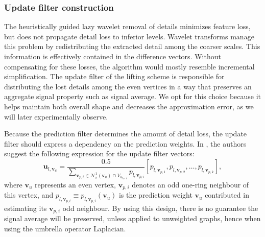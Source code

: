 \documentclass[graybox]{svmult}
\begin{document}
	
	\subsubsection{Update filter construction}
	The heuristically guided lazy wavelet removal of details minimizes feature loss, but does not propagate detail loss to inferior levels. Wavelet transforms manage this problem by redistributing the extracted detail among the coarser scales.  This information is effectively contained in the difference vectors. Without compensating for these losses, the algorithm would mostly resemble incremental simplification. The update filter of the lifting scheme is responsible for distributing the lost details among the even vertices in a way that preserves an aggregate signal property such as signal average. We opt for this choice because it helps maintain both overall shape and decreases the approximation error, as we will later experimentally observe. 
	
	Because the prediction filter determines the amount of detail loss, the update filter should express a dependency on the prediction weights. In \cite{Martinez2011}, the authors suggest the following expression for the update filter vectors:
	\begin{equation}
	\mathbf{u}_{l, \mathbf{v}_{u}} = \frac{0.5}{ \sum\limits_{\mathbf{v}_{p,i} \in \mathcal{N}_v^1(\mathbf{v}_u) \cap V_{o_{l+1}}} {  p_{l, \mathbf{v}_{p,i} } } } \left[ p_{l, \mathbf{v}_{p,1} }, p_{l, \mathbf{v}_{p,2} }, \ldots , p_{l, \mathbf{v}_{p,k} }\right],
	\label{eq_cds:smoothing_update_weights}
	\end{equation}
	where $\mathbf{v}_u$ represents an even vertex, $\mathbf{v}_{p,i}$ denotes an odd one-ring neighbour of this vertex, and $p_{l,\mathbf{v}_{p,i}} \equiv p_{l,\mathbf{v}_{p,i}}(\mathbf{v}_u)$ is the prediction weight $\mathbf{v}_u$ contributed in estimating its $\mathbf{v}_{p,i}$ odd neighbour.
	By using this design, there is no guarantee the signal average will be preserved, unless applied to unweighted graphs, hence when using the umbrella operator Laplacian.
	
\end{document}
